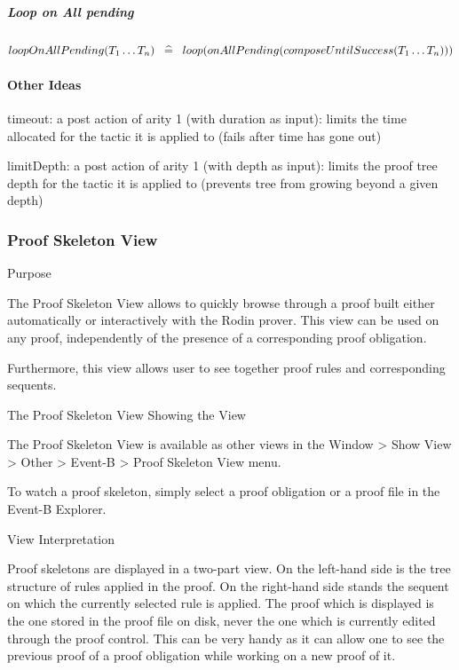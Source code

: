 \subparagraph{Loop on All pending}

$loopOnAllPending(T_1 \ldots T_n) \;\;\mathrel{\widehat=}\;\; loop(onAllPending(composeUntilSuccess(T_1 \ldots T_n)))  $

\paragraph{Other Ideas}

    timeout: a post action of arity 1 (with duration as input): limits the time allocated for the tactic it is applied to (fails after time has gone out)

    limitDepth: a post action of arity 1 (with depth as input): limits the proof tree depth for the tactic it is applied to (prevents tree from growing beyond a given depth) 

\subsubsection{Proof Skeleton View}


Purpose

The Proof Skeleton View allows to quickly browse through a proof built either automatically or interactively with the Rodin prover. This view can be used on any proof, independently of the presence of a corresponding proof obligation.

Furthermore, this view allows user to see together proof rules and corresponding sequents.

The Proof Skeleton View
Showing the View

The Proof Skeleton View is available as other views in the Window > Show View > Other > Event-B > Proof Skeleton View menu.

To watch a proof skeleton, simply select a proof obligation or a proof file in the Event-B Explorer.

View Interpretation

Proof skeletons are displayed in a two-part view. On the left-hand side is the tree structure of rules applied in the proof. On the right-hand side stands the sequent on which the currently selected rule is applied. The proof which is displayed is the one stored in the proof file on disk, never the one which is currently edited through the proof control. This can be very handy as it can allow one to see the previous proof of a proof obligation while working on a new proof of it. 

